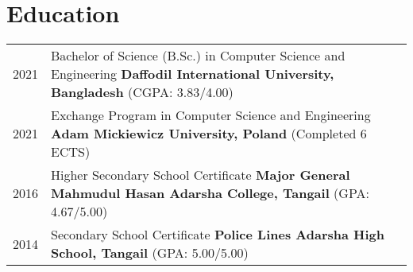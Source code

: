 \section{\textbf{Education}}
\begin{tabularx}{\linewidth}{@{}l X@{}}
    2021 & Bachelor of Science (B.Sc.) in Computer Science
    and Engineering
    \newline
    \textbf{Daffodil International University, Bangladesh} \hfill (CGPA: 3.83/4.00)
    \\

    2021 & Exchange Program in Computer Science and Engineering
    \newline
    \textbf{Adam Mickiewicz University, Poland} \hfill (Completed 6 ECTS)
    \\

    2016 & Higher Secondary School Certificate
    \newline
    \textbf{Major General Mahmudul Hasan Adarsha College, Tangail} \hfill (GPA:
    4.67/5.00) \\

    2014 & Secondary School Certificate
    \newline
    \textbf{Police Lines Adarsha High School, Tangail} \hfill (GPA: 5.00/5.00)
    \\
\end{tabularx}
